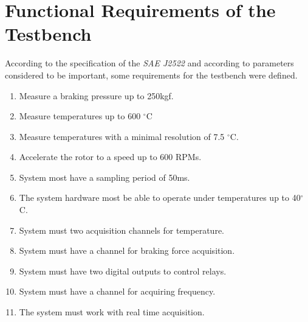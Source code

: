 \section{Functional Requirements of the Testbench}\label{sec:functionalRequirements}

	According to the specification of the \textit{SAE J2522} and according to parameters considered to be important, some requirements for the testbench were defined.

	\begin{enumerate}
		\item Measure a braking pressure up to 250kgf.\label{itm:func-req-1}
		\begin{comment}
		\item Apply a braking pressure of at least 300 kPa.\label{itm:func-req-2}
		\end{comment}
		\item Measure temperatures up to 600 $^{\circ}$C\label{itm:func-req-3}
		\item Measure temperatures with a minimal resolution of 7.5 $^{\circ}$C.\label{itm:func-req-4}
		\item Accelerate the rotor to a speed up to 600 RPMs.\label{itm:func-req-5}
		\item System most have a sampling period of 50ms.\label{itm:func-req-6}
		\item The system hardware most be able to operate under temperatures up to 40$^{\circ}$C.\label{itm:func-req-7}
		\item System must two acquisition channels for temperature.\label{itm:func-req-8}
		\item System must have a channel for braking force acquisition.\label{itm:func-req-9}
		\begin{comment}
		\item System must have a channel for vibration acquisition.\label{itm:func-req-10}
		\end{comment}
		\item System must have two digital outputs to control relays.\label{itm:func-req-11}
		\item System must have a channel for acquiring frequency.\label{itm:func-req-12}
		\item The system must work with real time acquisition.\label{itm:func-req-13}
		\begin{comment}
		\item The system must be able to detect when the sensors from the acquisition channels are disconnected.\label{itm:func-req-14}
		\end{comment}
	\end{enumerate}

